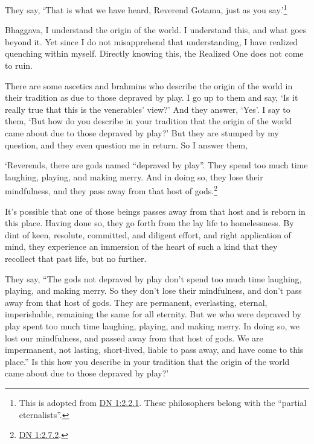 \documentclass[12pt,openany]{book}%
\begin{document}
They say, ‘That is what we have heard, Reverend Gotama, just as you say.’\footnote{This is adopted from \href{https://suttacentral.net/dn1/en/sujato\#2.2.1}{DN 1:2.2.1}. These philosophers belong with the “partial eternalists”. } 

Bhaggava, I understand the origin of the world. I understand this, and what goes beyond it. Yet since I do not misapprehend that understanding, I have realized quenching within myself. Directly knowing this, the Realized One does not come to ruin. 

There are some ascetics and brahmins who describe the origin of the world in their tradition as due to those depraved by play. I go up to them and say, ‘Is it really true that this is the venerables’ view?’ And they answer, ‘Yes’. I say to them, ‘But how do you describe in your tradition that the origin of the world came about due to those depraved by play?’ But they are stumped by my question, and they even question me in return. So I answer them, 

‘Reverends, there are gods named “depraved by play”. They spend too much time laughing, playing, and making merry. And in doing so, they lose their mindfulness, and they pass away from that host of gods.\footnote{\href{https://suttacentral.net/dn1/en/sujato\#2.7.2}{DN 1:2.7.2}. } 

It’s possible that one of those beings passes away from that host and is reborn in this place. Having done so, they go forth from the lay life to homelessness. By dint of keen, resolute, committed, and diligent effort, and right application of mind, they experience an immersion of the heart of such a kind that they recollect that past life, but no further. 

They say, “The gods not depraved by play don’t spend too much time laughing, playing, and making merry. So they don’t lose their mindfulness, and don’t pass away from that host of gods. They are permanent, everlasting, eternal, imperishable, remaining the same for all eternity. But we who were depraved by play spent too much time laughing, playing, and making merry. In doing so, we lost our mindfulness, and passed away from that host of gods. We are impermanent, not lasting, short-lived, liable to pass away, and have come to this place.” Is this how you describe in your tradition that the origin of the world came about due to those depraved by play?’ 
\end{document}
